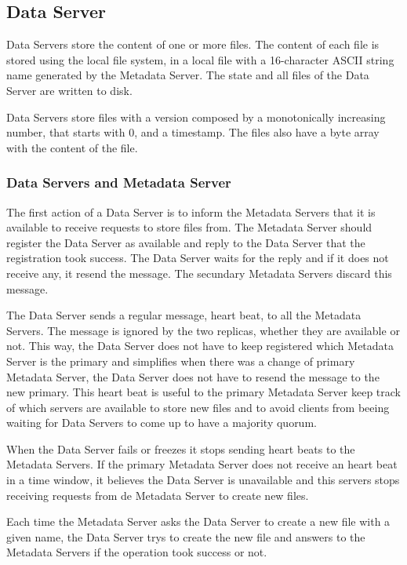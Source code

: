 \subsection{Data Server}

Data Servers store the content of one or more files. The content of each
file is stored using the local file system, in a local file with a
16-character ASCII string name generated by the Metadata Server. The
state and all files of the Data Server are written to disk.

Data Servers store files with a version composed by a
monotonically increasing number, that starts with 0, and a timestamp.
The files also have a byte array with the content of the file.

\subsubsection{Data Servers and Metadata Server}

The first action of a Data Server is to inform the Metadata Servers that
it is available to receive requests to store files from. The Metadata
Server should register the Data Server as available and reply to the Data
Server that the registration took success. The Data Server waits for the
reply and if it does not receive any, it resend the message. The secundary
Metadata Servers discard this message.

The Data Server sends a regular message, heart beat, to all the Metadata
Servers. The message is ignored by the two replicas, whether they are
available or not. This way, the Data Server does not have to keep
registered which Metadata Server is the primary and simplifies when
there was a change of primary Metadata Server, the Data Server does not
have to resend the message to the new primary.
This heart beat is useful to the primary Metadata Server keep track of
which servers are available to store new files and to avoid clients
from beeing waiting for Data Servers to come up to have a majority quorum.

When the Data Server fails or freezes it stops sending heart beats to
the Metadata Servers. If the primary Metadata Server does not receive an
heart beat in a time window, it believes the Data Server is unavailable
and this servers stops receiving requests from de Metadata Server to
create new files.

Each time the Metadata Server asks the Data Server to create a new file
with a given name, the Data Server trys to create the new file and answers
to the Metadata Servers if the operation took success or not.

